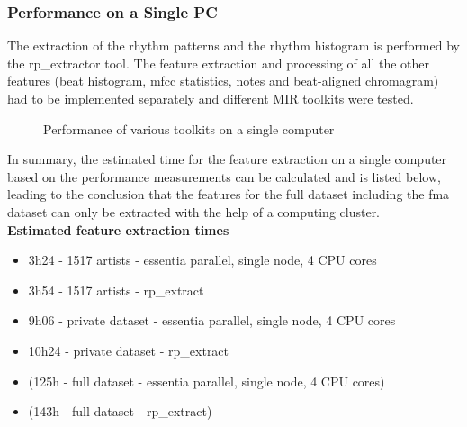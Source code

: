 \subsubsection{Performance on a Single PC}

The extraction of the rhythm patterns and the rhythm histogram is performed by the rp\_extractor tool. The feature extraction and processing of all the other features (beat histogram, mfcc statistics, notes and beat-aligned chromagram) had to be implemented separately and different MIR toolkits were tested. 

\begin{figure}[htbp]
	\centering
	\caption{Performance of various toolkits on a single computer}
	\label{perfex}
\end{figure}
\noindent In summary, the estimated time for the feature extraction on a single computer based on the performance measurements can be calculated and is listed below, leading to the conclusion that the features for the full dataset including the fma dataset can only be extracted with the help of a computing cluster.
\ \\
\textbf{Estimated feature extraction times}
\begin{itemize}
	\setlength\itemsep{-0.5em}
	\item 3h24 - 1517 artists - essentia parallel, single node, 4 CPU cores
	\item 3h54 - 1517 artists - rp\_extract
	\item 9h06 - private dataset - essentia parallel, single node, 4 CPU cores
	\item 10h24 - private dataset - rp\_extract
	\item (125h - full dataset - essentia parallel, single node, 4 CPU cores)
	\item (143h - full dataset - rp\_extract)
\end{itemize}

